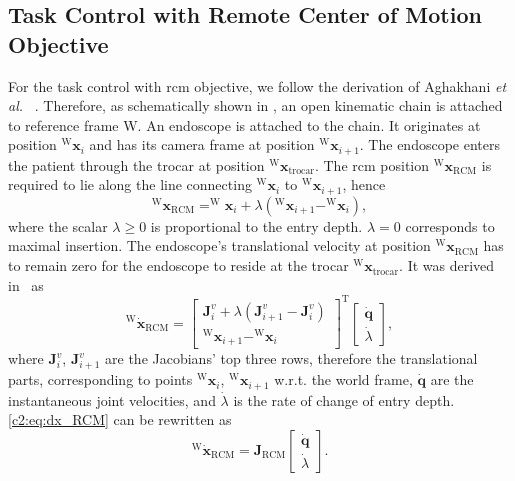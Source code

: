 \subsection{Task Control with Remote Center of Motion Objective}
\label{c2:sec:task_rcm}
For the task control with \gls{rcm} objective, we follow the derivation of Aghakhani \emph{et al.} ~\cite{aghakhani2013task}. Therefore, as schematically shown in , an open kinematic chain is attached to reference frame W. An endoscope is attached to the chain. It originates at position $^\text{W}\mathbf{x}_i$ and has its camera frame at position $^\text{W}\mathbf{x}_{i+1}$. The endoscope enters the patient through the trocar at position $^\text{W}\mathbf{x}_\text{trocar}$. The \gls{rcm} position $^\text{W}\mathbf{x}_\text{RCM}$ is required to lie along the line connecting $^\text{W}\mathbf{x}_i$ to $^\text{W}\mathbf{x}_{i+1}$, hence
\begin{equation}
^\text{W}\mathbf{x}_\text{RCM} = ^\text{W}\mathbf{x}_i+\lambda\left(^\text{W}\mathbf{x}_{i+1} - ^\text{W}\mathbf{x}_i\right),
\label{c2:eq:lambda}
\end{equation}
where the scalar $\lambda \geq 0$ is proportional to the entry depth. $\lambda = 0$ corresponds to maximal insertion. The endoscope's translational velocity at position $^\text{W}\mathbf{x}_\text{RCM}$ has to remain zero for the endoscope to reside at the trocar $^\text{W}\mathbf{x}_\text{trocar}$. It was derived in~\cite{aghakhani2013task} as
\begin{equation}
    ^\text{W}\dot{\mathbf{x}}_\text{RCM} = \begin{bmatrix}\mathbf{J}^v_i + \lambda(\mathbf{J}^v_{i+1}-\mathbf{J}^v_i)\\ ^\text{W}\mathbf{x}_{i+1} - ^\text{W}\mathbf{x}_i\end{bmatrix}^\text{T}\begin{bmatrix}\dot{\mathbf{q}} \\ \dot{\lambda}\end{bmatrix},
    \label{c2:eq:dx_RCM}
\end{equation}
where $\mathbf{J}^v_i$, $\mathbf{J}^v_{i+1}$ are the Jacobians' top three rows, therefore the translational parts, corresponding to points $^\text{W}\mathbf{x}_i$, $^\text{W}\mathbf{x}_{i+1}$ w.r.t. the world frame, $\dot{\mathbf{q}}$ are the instantaneous joint velocities, and $\dot{\lambda}$ is the rate of change of entry depth. \eqref{c2:eq:dx_RCM} can be rewritten as
\begin{equation}
    ^\text{W}\dot{\mathbf{x}}_\text{RCM} = \mathbf{J}_\text{RCM}\begin{bmatrix}\dot{\mathbf{q}} \\ \dot{\lambda}\end{bmatrix}.
    \label{c2:eq:dx_RCM_short}
\end{equation}
